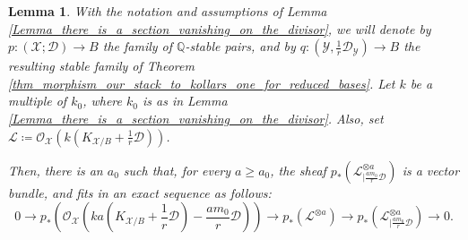\documentclass{amsart}
\newcommand{\bQ}{\mathbb{Q}}
\newcommand{\cD}{\mathcal{D}}
\newcommand{\cL}{\mathcal{L}}
\newcommand{\cO}{\mathcal{O}}
\newcommand{\cX}{\mathcal{X}}
\newcommand{\cY}{\mathcal{Y}}
\newtheorem{Lemma}[theorem]{Lemma}
\theoremstyle{definition}
\begin{document}
\begin{Lemma}\label{lemma_lc_restricted_to_mD_pushes_forward_to_a_vector_bundle}
With the notation and assumptions of Lemma \ref{Lemma_there_is_a_section_vanishing_on_the_divisor}, we will denote by $p\colon (\cX;\cD)\to B$ the
family of $\bQ$-stable pairs, and by $q \colon (\cY,\frac{1}{r}\cD_\cY)\to B$ the resulting stable family of Theorem \ref{thm_morphism_our_stack_to_kollars_one_for_reduced_bases}.
Let $k$ be a multiple of $k_0$, where $k_0$ is as in Lemma \ref{Lemma_there_is_a_section_vanishing_on_the_divisor}.
Also, set $\cL \coloneqq \cO_\cX(k(K_{\cX/B} + \frac{1}{r}\cD))$.

Then, there is an $a_0$ such that, for every $a\ge a_0$, the sheaf $p_*(\cL_{|\frac{am_0}{r}\cD}^{\otimes a})$ is a vector bundle, and fits in an exact sequence as follows: 
\[
0\to p_*(\cO_\cX(ka(K_{\cX/B} + \frac{1}{r}\cD) - \frac{am_0}{r}\cD)) \to p_*( \cL^{\otimes a}) \to p_*(\cL_{|\frac{am_0}{r}\cD}^{\otimes a})\to 0.
\]
\end{Lemma}
\end{document}
